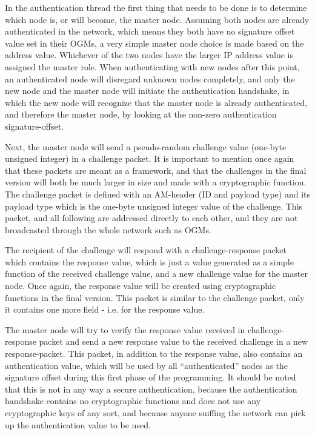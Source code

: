 In the authentication thread the first thing that needs to be done is to
determine which node is, or will become, the master node. Assuming both nodes
are already authenticated in the network, which means they both have no
signature offset value set in their \acp{OGM}, a very simple master node choice
is made based on the address value. Whichever of the two nodes have the larger
IP address value is assigned the master role. When authenticating with new nodes
after this point, an authenticated node will disregard unknown nodes
completely, and only the new node and the master node will initiate
the authentication handshake, in which the new node will recognize that the
master node is already authenticated, and therefore the master node, by looking
at the non-zero authentication signature-offset.

Next, the master node will send a pseudo-random challenge value (one-byte
unsigned integer) in a challenge packet. It is important to mention once
again that these packets are meant as a framework, and that the challenges in
the final version will both be much larger in size and made with a
cryptographic function. The challenge packet is defined with an \ac{AM}-header
(ID and payload type) and its payload type which is the one-byte unsigned
integer value of the challenge. This packet, and all following are addressed
directly to each other, and they are not broadcasted through the whole network
such as \acp{OGM}.

The recipient of the challenge will respond with a challenge-response packet
which contains the response value, which is just a value generated as a simple
function of the received challenge value, and a new challenge value for the
master node. Once again, the response value will be created using
cryptographic functions in the final version. This packet is similar to the
challenge packet, only it contains one more field - i.e. for the response value.

The master node will try to verify the response value received in
challenge-response packet and send a new response value to the received
challenge in a new response-packet. This packet, in addition to the response
value, also contains an authentication value, which will be used by all
``authenticated'' nodes as the signature offset during this first phase of the
programming. It should be noted that this is not in any way a secure
authentication, because the authentication handshake contains no cryptographic
functions and does not use any cryptographic keys of any sort, and because
anyone sniffing the network can pick up the authentication value to be used.

